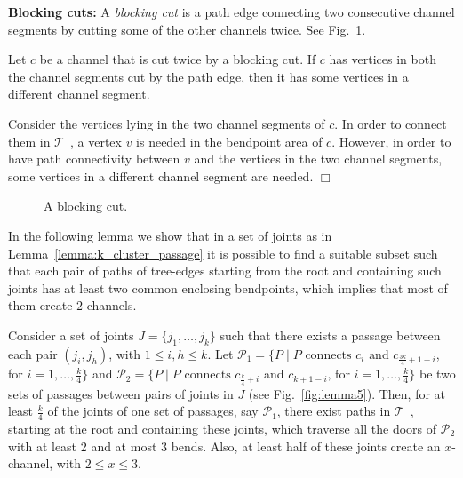 \documentclass[a4paper,10pt]{llncs}
\newcounter{prop}
\renewenvironment{proof}
{{\bf Proof:}}{\hspace*{\fill}$\Box$\par\vspace{2mm}}
\newcommand{\T}{\mbox{$\mathcal T$ }}
\begin{document}
{\bf Blocking cuts:}
A \emph{blocking cut} is a path edge connecting two consecutive channel segments by cutting some of the other channels twice. See Fig.~\ref{fig:blocking}.

\begin{property}\label{prop:blocking-cut}
Let $c$ be a channel that is cut twice by a blocking cut. If $c$ has vertices in both the channel segments cut by the path edge, then it has some vertices in a different channel segment.
\end{property}
\begin{proof}
Consider the vertices lying in the two channel segments of $c$. In order to connect them in \T, a vertex $v$ is needed in the bendpoint area of $c$. However, in order to have path connectivity between $v$ and the vertices in the two channel segments, some vertices in a different channel segment are needed.
\end{proof}

\begin{figure}[hb]
\caption{A blocking cut.}
\label{fig:blocking}
\end{figure}

In the following lemma we show that in a set of joints as in Lemma~\ref{lemma:k_cluster_passage} it is possible to find a suitable subset such that each pair of paths of tree-edges starting from the root and containing such joints has at least two common enclosing bendpoints, which implies that most of them create $2$-channels.

\begin{lemma}\label{lemma:2_channels}
Consider a set of joints $J= \{j_1,\ldots ,j_k\}$ such that there exists a passage between each pair $(j_i,j_h)$, with $1 \leq i,h \leq k$. Let ${\mathcal P}_1 =\{P \mid P\textrm{ connects } c_i \textrm{ and } c_{\frac{3k}{4}+1-i}$, for $i=1,\dots, \frac{k}{4} \}$ and ${\mathcal P}_2 =\{P \mid P\textrm{ connects } c_{\frac{k}{4}+i} $ and $c_{k+1-i}  \textrm{, for } i=1,\dots, \frac{k}{4} \}$ be two sets of passages between pairs of joints in $J$ (see Fig.~\ref{fig:lemma5}). Then, for at least $\frac{k}{4}$ of the joints of one set of passages, say ${\mathcal P}_1$, there exist paths in \T, starting at the root and containing these joints, which traverse all the doors of ${\mathcal P}_2$ with at least 2 and at most 3 bends. Also, at least half of these joints create an $x$-channel, with $2\leq x \leq 3$.
\end{lemma}
\end{document}
